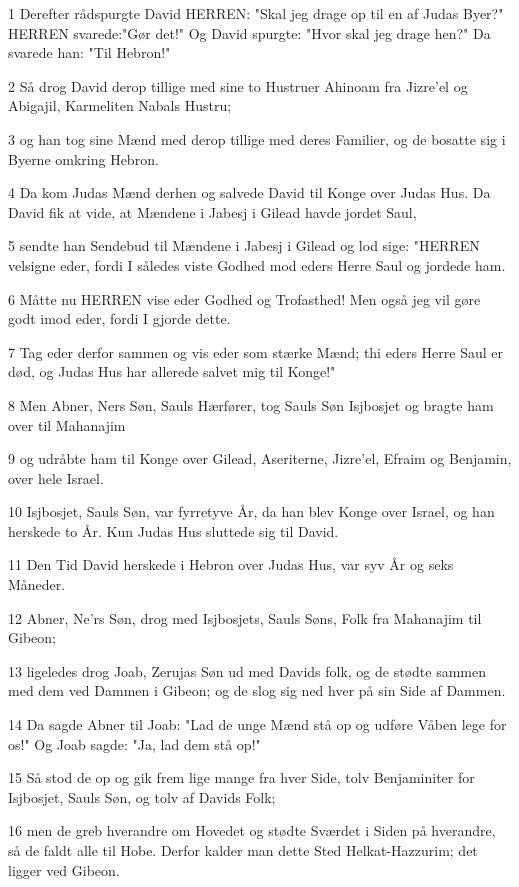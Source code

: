 \par 1 Derefter rådspurgte David HERREN: "Skal jeg drage op til en af Judas Byer?" HERREN svarede:"Gør det!" Og David spurgte: "Hvor skal jeg drage hen?" Da svarede han: "Til Hebron!"
\par 2 Så drog David derop tillige med sine to Hustruer Ahinoam fra Jizre'el og Abigajil, Karmeliten Nabals Hustru;
\par 3 og han tog sine Mænd med derop tillige med deres Familier, og de bosatte sig i Byerne omkring Hebron.
\par 4 Da kom Judas Mænd derhen og salvede David til Konge over Judas Hus. Da David fik at vide, at Mændene i Jabesj i Gilead havde jordet Saul,
\par 5 sendte han Sendebud til Mændene i Jabesj i Gilead og lod sige: "HERREN velsigne eder, fordi I således viste Godhed mod eders Herre Saul og jordede ham.
\par 6 Måtte nu HERREN vise eder Godhed og Trofasthed! Men også jeg vil gøre godt imod eder, fordi I gjorde dette.
\par 7 Tag eder derfor sammen og vis eder som stærke Mænd; thi eders Herre Saul er død, og Judas Hus har allerede salvet mig til Konge!"
\par 8 Men Abner, Ners Søn, Sauls Hærfører, tog Sauls Søn Isjbosjet og bragte ham over til Mahanajim
\par 9 og udråbte ham til Konge over Gilead, Aseriterne, Jizre'el, Efraim og Benjamin, over hele Israel.
\par 10 Isjbosjet, Sauls Søn, var fyrretyve År, da han blev Konge over Israel, og han herskede to År. Kun Judas Hus sluttede sig til David.
\par 11 Den Tid David herskede i Hebron over Judas Hus, var syv År og seks Måneder.
\par 12 Abner, Ne'rs Søn, drog med Isjbosjets, Sauls Søns, Folk fra Mahanajim til Gibeon;
\par 13 ligeledes drog Joab, Zerujas Søn ud med Davids folk, og de stødte sammen med dem ved Dammen i Gibeon; og de slog sig ned hver på sin Side af Dammen.
\par 14 Da sagde Abner til Joab: "Lad de unge Mænd stå op og udføre Våben lege for os!" Og Joab sagde: "Ja, lad dem stå op!"
\par 15 Så stod de op og gik frem lige mange fra hver Side, tolv Benjaminiter for Isjbosjet, Sauls Søn, og tolv af Davids Folk;
\par 16 men de greb hverandre om Hovedet og stødte Sværdet i Siden på hverandre, så de faldt alle til Hobe. Derfor kalder man dette Sted Helkat-Hazzurim; det ligger ved Gibeon.
